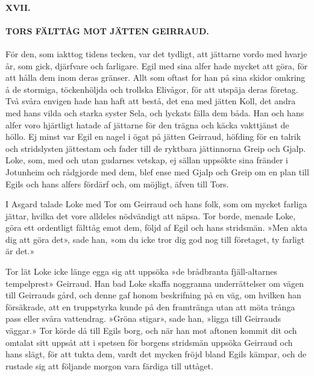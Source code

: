 \paragraph{XVII.}

\paragraph{TORS FÄLTTÅG MOT JÄTTEN GEIRRAUD.}

För den, som iakttog tidens tecken, var det tydligt, att jättarne vordo
med hvarje år, som gick, djärfvare och farligare. Egil med sina alfer
hade mycket att göra, för att hålla dem inom deras gränser. Allt som
oftast for han på sina skidor omkring å de stormiga, töckenhöljda och
trollska Elivågor, för att utspäja deras företag. Två svåra envigen hade
han haft att bestå, det ena med jätten Koll, det andra med hans vilda
och starka syster Sela, och lyckats fälla dem båda. Han och hans alfer
voro hjärtligt hatade af jättarne för den trägna och käcka vakttjänst de
höllo. Ej minst var Egil en nagel i ögat på jätten Geirraud, höfding för
en talrik och stridslysten jättestam och fader till de ryktbara
jättinnorna Greip och Gjalp. Loke, som, med och utan gudarnes vetskap,
ej sällan uppsökte sina fränder i Jotunheim och rådgjorde med dem, blef
ense med Gjalp och Greip om
\protect\hypertarget{lb1625905.xhtmlux5cux23start52}{}{}\protect\hypertarget{lb1625905.xhtmlux5cux23start52-a}{}{}\protect\hypertarget{lb1625905.xhtmlux5cux23start52-b}{}{}\protect\hypertarget{lb1625905.xhtmlux5cux23start52-c}{}{}\protect\hypertarget{lb1625905.xhtmlux5cux23start52-d}{}{}
en plan till Egils och hans alfers fördärf och, om möjligt, äfven till
Tors.

I Asgard talade Loke med Tor om Geirraud och hans folk, som om mycket
farliga jättar, hvilka det vore alldeles nödvändigt att näpsa. Tor
borde, menade Loke, göra ett ordentligt fälttåg emot dem, följd af Egil
och hans stridsmän. »Men akta dig att göra det», sade han, »om du icke
tror dig god nog till företaget, ty farligt är det.»

Tor lät Loke icke länge egga sig att uppsöka »de brådbranta
fjäll-altarnes tempelprest» Geirraud. Han bad Loke skaffa noggranna
underrättelser om vägen till Geirrauds gård, och denne gaf honom
beskrifning på en väg, om hvilken han försäkrade, att en truppstyrka
kunde på den framtränga utan att möta trånga pass eller svåra
vattendrag. »Gröna stigar», sade han, »ligga till Geirrauds väggar.» Tor
körde då till Egils borg, och när han mot aftonen kommit dit och omtalat
sitt uppsåt att i spetsen för borgens stridsmän uppsöka Geirraud och
hans slägt, för att tukta dem, vardt det mycken fröjd bland Egils
kämpar, och de rustade sig att följande morgon vara färdiga till
uttåget.


